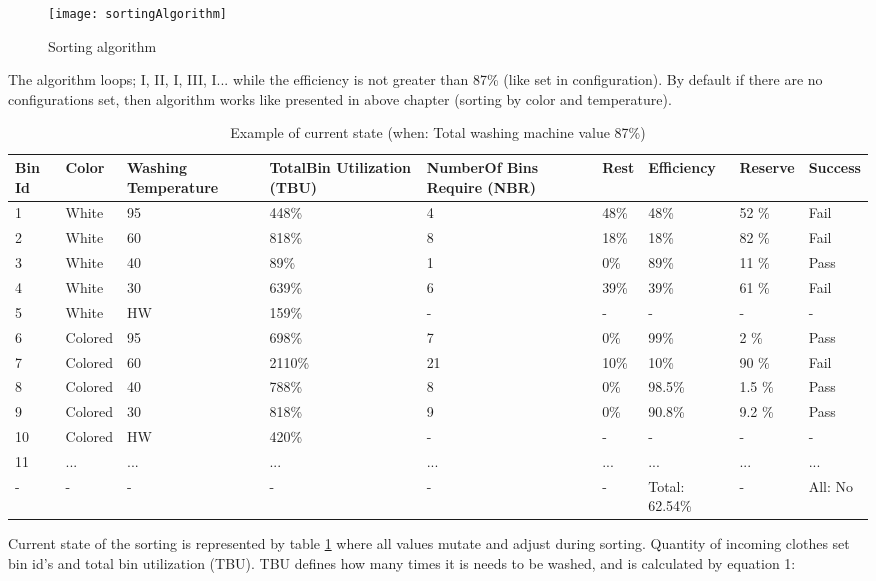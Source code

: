 \begin{figure}[h]
	\centering
		\texttt{[image: sortingAlgorithm]}
	\caption{Sorting algorithm}
	\label{fig:sortingAlgorithm}
\end{figure}

The algorithm loops;  I, II, I, III, I... while the efficiency is not greater than 87\% (like set in configuration). By default if there are no configurations set, then algorithm works like presented in above chapter (sorting by color and temperature).

\begin{table}[h]
	
    \begin{tabular}{ | p{0.4cm} | p{1cm} | p{2cm} | p{1.7cm} |p{2cm} |p{1cm} |p{1.3cm} |p{1.2cm} |p{1.3cm} |}
    \hline
	Bin Id & Color & Washing Temperature & TotalBin Utilization (TBU) & NumberOf Bins Require (NBR) & Rest & Efficiency & Reserve & Success\\ \hline
	1 & White & 95 & 448\% & 4 & 48\% & 48\% & 52 \% & Fail \\ \hline
	2 & White & 60 & 818\% & 8 & 18\% & 18\% & 82 \% & Fail \\ \hline
	3 & White & 40 & 89\% & 1 & 0\% & 89\% & 11 \% & Pass \\ \hline
	4 & White & 30 & 639\% & 6 & 39\% & 39\% & 61 \% & Fail \\ \hline
	5 & White & HW & 159\% & - & - & - & - & - \\ \hline
	6 & Colored & 95 & 698\% & 7 & 0\% & 99\% & 2 \% & Pass \\ \hline
	7 & Colored & 60 & 2110\% & 21 & 10\% & 10\% & 90 \% & Fail \\ \hline
	8 & Colored & 40 & 788\% & 8 & 0\% & 98.5\% & 1.5 \% & Pass \\ \hline
	9 & Colored & 30 & 818\% & 9 & 0\% & 90.8\% & 9.2 \% & Pass \\ \hline
	10 & Colored & HW & 420\% & - & - & - & - & - \\ \hline
	11 & ... & ... & ... & ... & ... & ... & ... & ... \\ \hline
	- & - & - & - & - & - & Total: 62.54\% & - & All: No \\ \hline
    \end{tabular}
	\caption{Example of current state (when: Total washing machine value 87\%)}
	\label{tab:currentState}
\end{table}

\newpage

Current state of the sorting is represented by table \ref{tab:currentState} where all values mutate and adjust during sorting. Quantity of incoming clothes set bin id's and total bin utilization (TBU). TBU defines how many times it is needs to be washed, and is calculated by equation 1:

